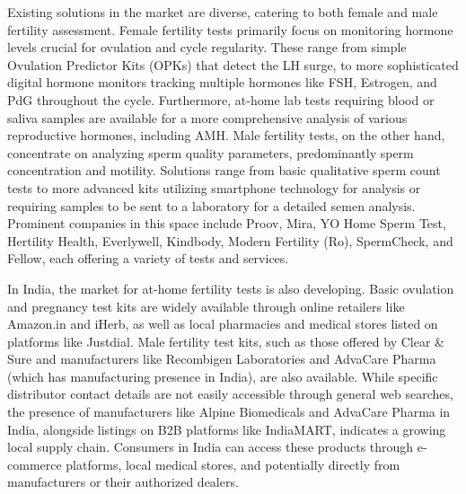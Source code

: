 \documentclass{article}
\begin{document}
Existing solutions in the market are diverse, catering to both female and male fertility assessment. Female fertility tests primarily focus on monitoring hormone levels crucial for ovulation and cycle regularity. These range from simple Ovulation Predictor Kits (OPKs) that detect the LH surge, to more sophisticated digital hormone monitors tracking multiple hormones like FSH, Estrogen, and PdG throughout the cycle. Furthermore, at-home lab tests requiring blood or saliva samples are available for a more comprehensive analysis of various reproductive hormones, including AMH. Male fertility tests, on the other hand, concentrate on analyzing sperm quality parameters, predominantly sperm concentration and motility. Solutions range from basic qualitative sperm count tests to more advanced kits utilizing smartphone technology for analysis or requiring samples to be sent to a laboratory for a detailed semen analysis. Prominent companies in this space include Proov, Mira, YO Home Sperm Test, Hertility Health, Everlywell, Kindbody, Modern Fertility (Ro), SpermCheck, and Fellow, each offering a variety of tests and services.

In India, the market for at-home fertility tests is also developing. Basic ovulation and pregnancy test kits are widely available through online retailers like Amazon.in and iHerb, as well as local pharmacies and medical stores listed on platforms like Justdial. Male fertility test kits, such as those offered by Clear & Sure and manufacturers like Recombigen Laboratories and AdvaCare Pharma (which has manufacturing presence in India), are also available. While specific distributor contact details are not easily accessible through general web searches, the presence of manufacturers like Alpine Biomedicals and AdvaCare Pharma in India, alongside listings on B2B platforms like IndiaMART, indicates a growing local supply chain. Consumers in India can access these products through e-commerce platforms, local medical stores, and potentially directly from manufacturers or their authorized dealers.
\end{document}
